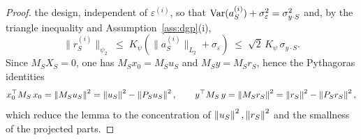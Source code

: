 \begin{proof}
{the design, independent of $\varepsilon^{(i)}$, so that
$\operatorname{Var}( a_S^{(i)} ) + \sigma_\varepsilon^2 = \sigma_{y \cdot S}^2$ and,
by the triangle inequality and Assumption~\ref{ass:dgp}(i),
\begin{equation}\label{eq:appc-psi2}
        \| r_S^{(i)} \|_{\psi_2}
        \;\le\;
        K_\psi \left( \| a_S^{(i)} \|_{L_2} + \sigma_\varepsilon \right)
        \;\le\;
        \sqrt{2}\, K_\psi\, \sigma_{y \cdot S}.
\end{equation}
Since $M_S X_S = 0$, one has $M_S x_0 = M_S u_S$ and
$M_S y = M_S r_S$, hence the Pythagoras identities
\begin{equation}\label{eq:appc-pyth}
        x_0^\top M_S\, x_0
        = \left\lVert  M_S u_S  \right\rVert^2
        = \left\lVert  u_S  \right\rVert^2 - \left\lVert  P_S u_S  \right\rVert^2,
        \qquad
        y^\top M_S\, y
        = \left\lVert  M_S r_S  \right\rVert^2
        = \left\lVert  r_S  \right\rVert^2 - \left\lVert  P_S r_S  \right\rVert^2,
\end{equation}
which reduce the lemma to the concentration of $\left\lVert u_S \right\rVert^2,
\left\lVert r_S \right\rVert^2$ and the smallness of the projected parts.

}
\end{proof}
